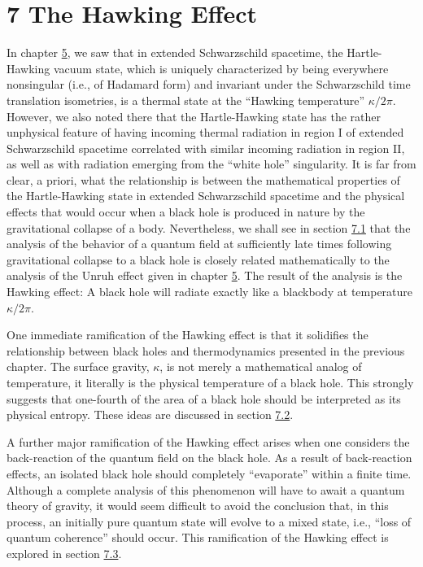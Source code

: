 \documentclass[11pt,a4paper]{article}
\begin{document}
\clearpage
\hypertarget{source-164}{}
\section*{7 The Hawking Effect}\hypertarget{sec:7}{}

In chapter \hyperlink{sec:5}{5}, we saw that in extended Schwarzschild spacetime, the Hartle-Hawking vacuum state, which is uniquely characterized by being everywhere nonsingular (i.e., of Hadamard form) and invariant under the Schwarzschild time translation isometries, is a thermal state at the ``Hawking temperature'' \(\kappa/2\pi\). However, we also noted there that the Hartle-Hawking state has the rather unphysical feature of having incoming thermal radiation in region I of extended Schwarzschild spacetime correlated with similar incoming radiation in region II, as well as with radiation emerging from the ``white hole'' singularity. It is far from clear, a priori, what the relationship is between the mathematical properties of the Hartle-Hawking state in extended Schwarzschild spacetime and the physical effects that would occur when a black hole is produced in nature by the gravitational collapse of a body. Nevertheless, we shall see in section \hyperlink{sec:7.1}{7.1} that the analysis of the behavior of a quantum field at sufficiently late times following gravitational collapse to a black hole is closely related mathematically to the analysis of the Unruh effect given in chapter \hyperlink{sec:5}{5}. The result of the analysis is the Hawking effect: A black hole will radiate exactly like a blackbody at temperature \(\kappa/2\pi\).

One immediate ramification of the Hawking effect is that it solidifies the relationship between black holes and thermodynamics presented in the previous chapter. The surface gravity, \(\kappa\), is not merely a mathematical analog of temperature, it literally is the physical temperature of a black hole. This strongly suggests that one-fourth of the area of a black hole should be interpreted as its physical entropy. These ideas are discussed in section \hyperlink{sec:7.2}{7.2}.

A further major ramification of the Hawking effect arises when one considers the back-reaction of the quantum field on the black hole. As a result of back-reaction effects, an isolated black hole should completely ``evaporate'' within a finite time. Although a complete analysis of this phenomenon will have to await a quantum theory of gravity, it would seem difficult to avoid the conclusion that, in this process, an initially pure quantum state will evolve to a \hypertarget{source-165}{} mixed state, i.e., ``loss of quantum coherence'' should occur. This ramification of the Hawking effect is explored in section \hyperlink{sec:7.3}{7.3}.
\end{document}
